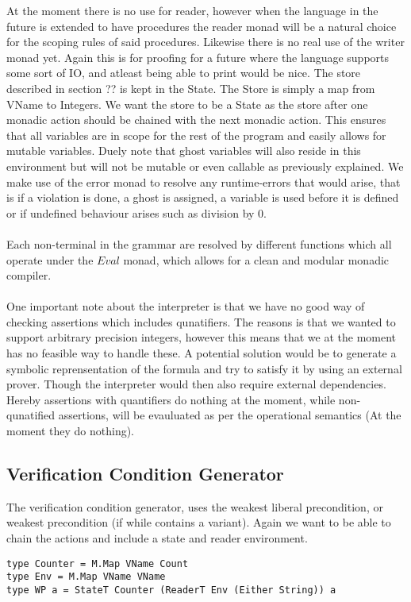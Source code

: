 At the moment there is no use for reader, however when the language in the future is extended to have procedures the reader monad will be a natural choice for the scoping rules of said procedures.
Likewise there is no real use of the writer monad yet. Again this is for proofing for a future where the language supports some sort of IO, and atleast being able to print would be nice.
The store described in section ?? is kept in the State. The Store is simply a map from VName to Integers. We want the store to be a State as the store after one monadic action should be chained with the next monadic action. This ensures that all variables are in scope for the rest of the program and easily allows for mutable variables.
Duely note that ghost variables will also reside in this environment but will not be mutable or even callable as previously explained.
We make use of the error monad to resolve any runtime-errors that would arise, that is if a violation is done, a ghost is assigned, a variable is used before it is defined or if undefined behaviour arises such as division by 0.
\\~\\
Each non-terminal in the grammar are resolved by different functions which all operate under the $Eval$ monad, which allows for a clean and modular monadic compiler.
\\~\\
One important note about the interpreter is that we have no good way of checking assertions which includes qunatifiers. The reasons is that we wanted to support arbitrary precision integers, however this means that we at the moment has no feasible way to handle these. A potential solution would be to generate a symbolic reprensentation of the formula and try to satisfy it by using an external prover. Though the interpreter would then also require external dependencies. Hereby assertions with quantifiers do nothing at the moment, while non-qunatified assertions, will be evauluated as per the operational semantics (At the moment they do nothing).

\subsection{Verification Condition Generator}
The verification condition generator, uses the weakest liberal precondition, or weakest precondition (if while contains a variant). Again we want to be able to chain the actions and include a state and reader environment.

\begin{lstlisting}
type Counter = M.Map VName Count
type Env = M.Map VName VName
type WP a = StateT Counter (ReaderT Env (Either String)) a
\end{lstlisting}

